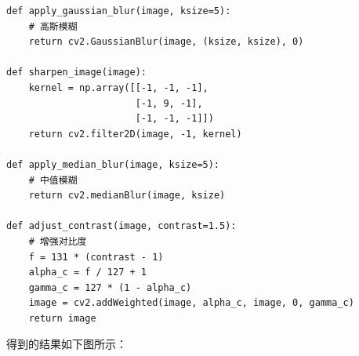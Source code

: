 \documentclass[a4paper,12pt]{article}
\begin{document}
\begin{lstlisting}[style=python]
def apply_gaussian_blur(image, ksize=5):
    # 高斯模糊
    return cv2.GaussianBlur(image, (ksize, ksize), 0)

def sharpen_image(image):
    kernel = np.array([[-1, -1, -1],
                       [-1, 9, -1],
                       [-1, -1, -1]])
    return cv2.filter2D(image, -1, kernel)

def apply_median_blur(image, ksize=5):
    # 中值模糊
    return cv2.medianBlur(image, ksize)

def adjust_contrast(image, contrast=1.5):
    # 增强对比度
    f = 131 * (contrast - 1)
    alpha_c = f / 127 + 1
    gamma_c = 127 * (1 - alpha_c)
    image = cv2.addWeighted(image, alpha_c, image, 0, gamma_c)
    return image
\end{lstlisting}

得到的结果如下图所示：
\end{document}
